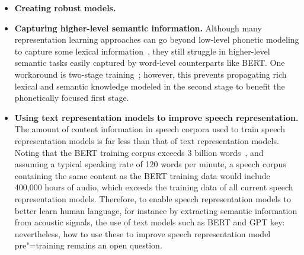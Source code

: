 \begin{itemize}
\item \textbf{Creating robust models.} 

\item \textbf{Capturing higher-level semantic information.} Although many representation learning approaches can go beyond low-level phonetic modeling to capture some lexical information~\parencite{nguyen_are_2022}, they still struggle in higher-level semantic tasks easily captured by word-level counterparts like BERT. One workaround is two-stage training~\parencite{kharitonov_textfree_2021, nguyen_generative_2022}; however, this prevents propagating rich lexical and semantic knowledge modeled in the second stage to benefit the phonetically focused first stage.

\item \textbf{Using text representation models to improve speech representation.} The amount of content information in speech corpora used to train speech representation models is far less than that of text representation models. Noting that the BERT training corpus exceeds 3 billion words~\parencite{devlin_bert_2018}, and assuming a typical speaking rate of 120 words per minute, a speech corpus containing the same content as the BERT training data would include 400,000 hours of audio, which exceeds the  training data of all current speech representation models. Therefore, to enable speech representation models to better learn human language, for instance by extracting semantic information from acoustic signals, the use of text models such as BERT and GPT   key: nevertheless, how to use these to improve speech representation model pre"=training remains an open question. 

\end{itemize}

